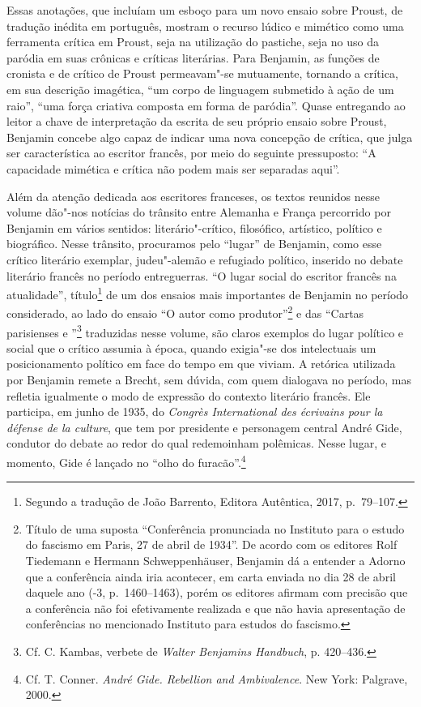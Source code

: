 Essas anotações, que incluíam um esboço para um novo ensaio sobre Proust, de tradução inédita em português, mostram o recurso lúdico e mimético como uma ferramenta crítica em Proust, seja na utilização do pastiche, seja no uso da paródia em suas crônicas e críticas literárias. Para Benjamin, as funções de cronista e de crítico de Proust permeavam"-se mutuamente, tornando a crítica, em sua descrição imagética, ``um corpo de linguagem submetido à ação de um raio'', ``uma força criativa composta em forma de paródia''. Quase entregando ao leitor a chave de interpretação da escrita de seu próprio ensaio sobre Proust, Benjamin concebe algo capaz de indicar uma nova concepção de crítica, que julga ser característica ao escritor francês, por meio do seguinte pressuposto: ``A capacidade mimética e crítica não podem mais ser separadas aqui''.

Além da atenção dedicada aos escritores franceses, os textos reunidos nesse volume dão"-nos notícias do trânsito
entre Alemanha e França percorrido por Benjamin em vários sentidos:
literário"-crítico, filosófico, artístico, político e biográfico. Nesse trânsito, procuramos pelo ``lugar'' de Benjamin, como esse crítico literário exemplar,
judeu"-alemão e refugiado político, inserido no debate literário francês no período
entreguerras. ``O lugar social do escritor francês na atualidade'',
título\footnote{Segundo a tradução de João Barrento, Editora Autêntica,
  2017, p.~79--107.} de um dos ensaios mais importantes de Benjamin no
período considerado, ao lado do ensaio ``O autor como
produtor''\footnote{Título de uma suposta ``Conferência pronunciada no
  Instituto para o estudo do fascismo em Paris, 27 de abril de 1934''.
  De acordo com os editores Rolf Tiedemann e Hermann Schweppenhäuser,
  Benjamin dá a entender a Adorno que a conferência ainda iria
  acontecer, em carta enviada no dia 28 de abril daquele ano (-3, p.~1460--1463), porém os editores afirmam com
  precisão que a conferência não foi efetivamente realizada e que não
  havia apresentação de conferências no mencionado Instituto para
  estudos do fascismo.} e das ``Cartas parisienses  e ''\footnote{Cf.
  C. Kambas, verbete de \emph{Walter Benjamins Handbuch}, p. 420--436.}
traduzidas nesse volume, são claros exemplos do lugar político e social
que o crítico assumia à época, quando exigia"-se dos intelectuais um
posicionamento político em face do tempo em que viviam. A retórica utilizada por
Benjamin remete a Brecht, sem dúvida, com quem dialogava no período, mas
refletia igualmente o modo de expressão do contexto literário francês.
Ele participa, em junho de 1935, do \emph{Congrès International des
écrivains pour la défense de la culture}, que tem por presidente e
personagem central André Gide, condutor do debate ao redor do qual
redemoinham polêmicas. Nesse lugar, e momento, Gide é lançado no ``olho do
furacão''.\footnote{Cf. T. Conner. \emph{André Gide. Rebellion and
  Ambivalence}. New York: Palgrave, 2000.}

